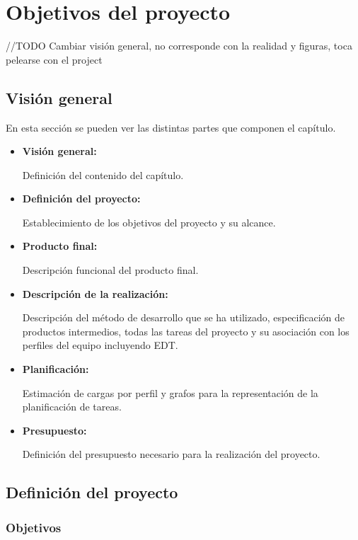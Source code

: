 \chapter{Objetivos del proyecto}

//TODO Cambiar visión general, no corresponde con la realidad y figuras, toca pelearse con el project

	\section{Visión general}

		En esta sección se pueden ver las distintas partes que componen el capítulo.

		\begin{itemize}
			\item \textbf{Visión general:}
				
			Definición del contenido del capítulo.
			
			\item \textbf{Definición del proyecto:}
				
			Establecimiento de los objetivos del proyecto y su alcance.

			\item \textbf{Producto final:}
				
			Descripción funcional del producto final.

			\item \textbf{Descripción de la realización:}
				
			Descripción del método de desarrollo que se ha utilizado, especificación de productos intermedios, todas las tareas del proyecto y su asociación con los perfiles del equipo incluyendo EDT.

			\item \textbf{Planificación:}
				
			Estimación de cargas por perfil y grafos para la representación de la planificación de tareas.

			\item \textbf{Presupuesto:}
				
			Definición del presupuesto necesario para la realización del proyecto.
		\end{itemize}

	\section{Definición del proyecto}

		\subsection{Objetivos}

